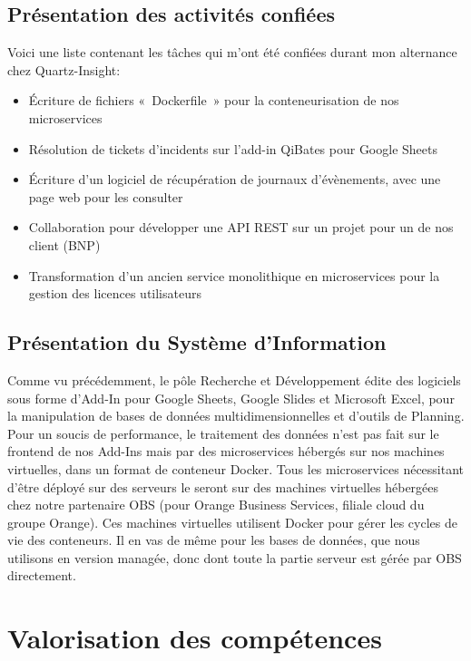 \documentclass[a4paper, 11pt]{report}
\begin{document}
\section{Présentation des activités confiées}
Voici une liste contenant les tâches qui m’ont été confiées durant mon alternance chez Quartz-Insight:
\begin{itemize}
  \item Écriture de fichiers « Dockerfile » pour la conteneurisation de nos microservices
  \item Résolution de tickets d’incidents sur l’add-in QiBates pour Google Sheets
  \item Écriture d’un logiciel de récupération de journaux d’évènements, avec une page web pour les consulter
  \item Collaboration pour développer une API REST sur un projet pour un de nos client (BNP)
  \item Transformation d’un ancien service monolithique en microservices pour la gestion des licences utilisateurs
\end{itemize}

\section{Présentation du Système d’Information}
Comme vu précédemment, le pôle Recherche et Développement édite des logiciels sous forme d’Add-In pour Google Sheets, Google Slides et Microsoft Excel, pour la manipulation de bases de données multidimensionnelles et d’outils de Planning.
Pour un soucis de performance, le traitement des données n’est pas fait sur le frontend de nos Add-Ins mais par des microservices hébergés sur nos machines virtuelles, dans un format de conteneur Docker.
\newline
\newline
Tous les microservices nécessitant d’être déployé sur des serveurs le seront sur des machines virtuelles hébergées chez notre partenaire OBS (pour Orange Business Services, filiale cloud du groupe Orange).
Ces machines virtuelles utilisent Docker pour gérer les cycles de vie des conteneurs.
Il en vas de même pour les bases de données, que nous utilisons en version managée, donc dont toute la partie serveur est gérée par OBS directement.

\chapter{Valorisation des compétences}
\end{document}
